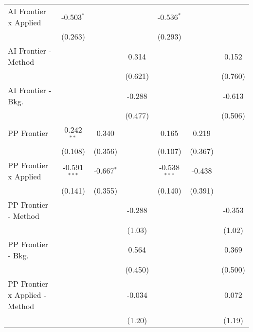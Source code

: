 \begin{tabular}{lcccccc}
   AI Frontier x Applied          & -0.503$^{*}$   &                &                & -0.536$^{*}$   &                &   \\   
                                  & (0.263)        &                &                & (0.293)        &                &   \\   
   AI Frontier - Method           &                &                & 0.314          &                &                & 0.152\\   
                                  &                &                & (0.621)        &                &                & (0.760)\\   
   AI Frontier - Bkg.             &                &                & -0.288         &                &                & -0.613\\   
                                  &                &                & (0.477)        &                &                & (0.506)\\   
   PP Frontier                    & 0.242$^{**}$   & 0.340          &                & 0.165          & 0.219          &   \\   
                                  & (0.108)        & (0.356)        &                & (0.107)        & (0.367)        &   \\   
   PP Frontier x Applied          & -0.591$^{***}$ & -0.667$^{*}$   &                & -0.538$^{***}$ & -0.438         &   \\   
                                  & (0.141)        & (0.355)        &                & (0.140)        & (0.391)        &   \\   
   PP Frontier - Method           &                &                & -0.288         &                &                & -0.353\\   
                                  &                &                & (1.03)         &                &                & (1.02)\\   
   PP Frontier - Bkg.             &                &                & 0.564          &                &                & 0.369\\   
                                  &                &                & (0.450)        &                &                & (0.500)\\   
   PP Frontier x Applied - Method &                &                & -0.034         &                &                & 0.072\\   
                                  &                &                & (1.20)         &                &                & (1.19)\\   

\end{tabular}
